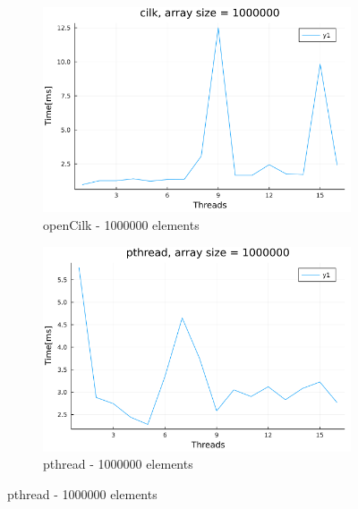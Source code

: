 \documentclass[11pt,a4paper,onecolumn,final]{article}
\begin{document}
\begin{figure}
    \begin{subfigure}{.5\textwidth}
        \centering
        \includegraphics[width=.9\linewidth]{../data/image/method/cilk_1000000.png}
        \caption{openCilk - 1000000 elements}
    \end{subfigure}%
    \begin{subfigure}{.5\textwidth}
        \centering
        \includegraphics[width=.9\linewidth]{../data/image/method/pthread_1000000.png}
        \caption{pthread - 1000000 elements}
    \end{subfigure}
\end{figure}
\end{document}
